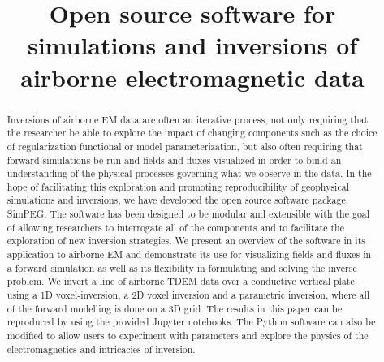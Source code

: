 \documentclass[paper]{geophysics}
\begin{document}
\title{Open source software for simulations and inversions of airborne electromagnetic data}

\renewcommand{\thefootnote}{\fnsymbol{footnote}}





\maketitle

\begin{abstract}
Inversions of airborne EM data are often an iterative process, not only requiring that the researcher be able to explore the impact of changing components such as the choice of regularization functional or model parameterization, but also often requiring that forward simulations be run and fields and fluxes visualized in order to build an understanding of the physical processes governing what we observe in the data. In the hope of facilitating this exploration and promoting reproducibility of geophysical simulations and inversions, we have developed the open source software package, SimPEG. The software has been designed to be modular and extensible with the goal of allowing researchers to interrogate all of the components and to facilitate the exploration of new inversion strategies. We present an overview of the software in its application to airborne EM and demonstrate its use for visualizing fields and fluxes in a forward simulation as well as its flexibility in formulating and solving the inverse problem. We invert a line of airborne TDEM data over a conductive vertical plate using a 1D voxel-inversion, a 2D voxel inversion and a parametric inversion, where all of the forward modelling is done on a 3D grid. The results in this paper can be reproduced  by using the provided Jupyter notebooks. The Python software can also be modified to allow users to experiment with parameters and explore the physics of the electromagnetics and intricacies of inversion.
\end{abstract}
\end{document}

